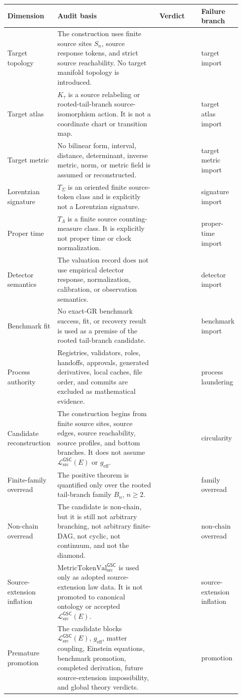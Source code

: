 \documentclass[11pt]{article}
\newcommand{\MetricTokenVal}{\mathrm{MetricTokenVal}_{\mathrm{src}}^{\mathsf{GSC}}}
\newcommand{\MetricData}{\mathcal{L}_{\mathrm{src}}^{\mathsf{GSC}}}
\newcommand{\geff}{g_{\mathrm{eff}}}
\newcommand{\Bn}{B_n}
\newcommand{\Pass}{\mathrm{pass\_no\_smuggling\_detected}}
\begin{document}
\begin{longtable}{p{0.19\linewidth}p{0.44\linewidth}p{0.18\linewidth}p{0.13\linewidth}}
\toprule
Dimension & Audit basis & Verdict & Failure branch \\
\midrule
Target topology &
The construction uses finite source sites \(S_n\), source response tokens,
and strict source reachability. No target manifold topology is introduced. &
\Pass &
target import \\
Target atlas &
\(K_{\tau}\) is a source relabeling or rooted-tail-branch source-isomorphism
action. It is not a coordinate chart or transition map. &
\Pass &
target atlas import \\
Target metric &
No bilinear form, interval, distance, determinant, inverse metric, norm, or
metric field is assumed or reconstructed. &
\Pass &
target metric import \\
Lorentzian signature &
\(T_{\Sigma}\) is an oriented finite source-token class and is explicitly not
a Lorentzian signature. &
\Pass &
signature import \\
Proper time &
\(T_{\Lambda}\) is a finite source counting-measure class. It is explicitly
not proper time or clock normalization. &
\Pass &
proper-time import \\
Detector semantics &
The valuation record does not use empirical detector response,
normalization, calibration, or observation semantics. &
\Pass &
detector import \\
Benchmark fit &
No exact-GR benchmark success, fit, or recovery result is used as a premise
of the rooted tail-branch candidate. &
\Pass &
benchmark import \\
Process authority &
Registries, validators, roles, handoffs, approvals, generated derivatives,
local caches, file order, and commits are excluded as mathematical evidence. &
\Pass &
process laundering \\
Candidate reconstruction &
The construction begins from finite source sites, source edges, source
reachability, source profiles, and bottom branches. It does not assume
\(\MetricData(E)\) or \(\geff\). &
\Pass &
circularity \\
Finite-family overread &
The positive theorem is quantified only over the rooted tail-branch family
\(\Bn\), \(n\ge 2\). &
\Pass &
family overread \\
Non-chain overread &
The candidate is non-chain, but it is still not arbitrary branching, not
arbitrary finite-DAG, not cyclic, not continuum, and not the diamond. &
\Pass &
non-chain overread \\
Source-extension inflation &
\(\MetricTokenVal\) is used only as adopted source-extension law data. It is
not promoted to canonical ontology or accepted \(\MetricData(E)\). &
\Pass &
source-extension inflation \\
Premature promotion &
The candidate blocks \(\MetricData(E)\), \(\geff\), matter coupling,
Einstein equations, benchmark promotion, completed derivation, future
source-extension impossibility, and global theory verdicts. &
\Pass &
promotion \\
\bottomrule
\end{longtable}
\end{document}
